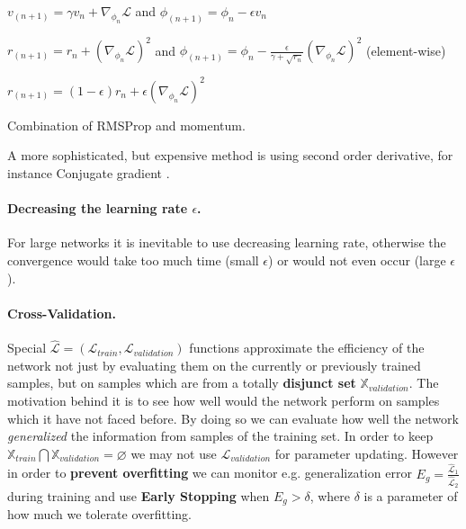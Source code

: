 \begin{description}[align=right,labelwidth=3cm]
\item[Momentum] \cite{sutskever2013importance}
    $v_{(n+1)}=\gamma v_{n} + \nabla_{\phi_n}\mathcal{L}$ and 
    $\phi_{(n+1)} = \phi_n -\epsilon v_n$
\item[Adagrad] \cite{duchi2011adaptive}
    $r_{(n+1)}=r_n+\left(\nabla_{\phi_n}\mathcal{L}\right)^2$  and 
    $\phi_{(n+1)} = \phi_n - \frac{\epsilon}{\gamma + \sqrt{r_n}} \left(\nabla_{\phi_n}\mathcal{L}\right)^2$ (element-wise) 
\item[RMSProp] \cite{rmsprop} $r_{(n+1)}=(1-\epsilon)r_n + \epsilon\left(\nabla_{\phi_n}\mathcal{L}\right)^2$
\item[Adam] \cite{kingma2014adam} Combination of RMSProp and momentum.
\end{description}
A more sophisticated, but expensive method is using second order derivative, for instance Conjugate gradient \cite{shewchuk1994introduction}.

\paragraph{Decreasing the learning rate $\epsilon$.}
For large networks it is inevitable to use decreasing learning rate, otherwise the convergence would take too much time (small $\epsilon$) or would not even occur (large $\epsilon$). 

\paragraph{Cross-Validation.} Special $\hat{\mathcal{L}}=(\mathcal{L}_{train}, \mathcal{L}_{validation})$ functions approximate the efficiency of the network not just by evaluating them on the currently or previously trained samples, but on samples which are from a totally \textbf{disjunct set} $\mathbb{X}_{validation}$.
The motivation behind it is to see how well would the network perform on samples which it have not faced before.
By doing so we can evaluate how well the network \emph{generalized} the information from samples of the training set.
In order to keep $\mathbb{X}_{train} \bigcap \mathbb{X}_{validation} = \varnothing$ we may not use $\mathcal{L}_{validation}$ for parameter updating.
However in order to \textbf{prevent overfitting} we can monitor e.g. generalization error $E_g=\frac{\hat{\mathcal{L}}_1}{\hat{\mathcal{L}}_2}$ during training 
and use \textbf{Early Stopping} when $E_g > \delta$, where $\delta$ is a parameter of how much we tolerate overfitting.

